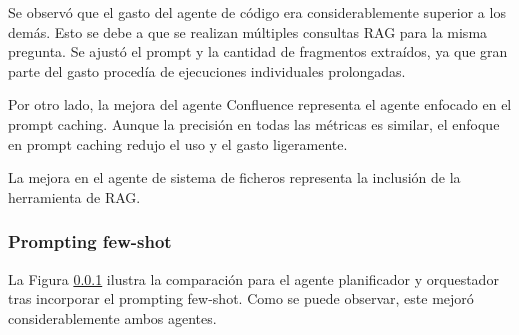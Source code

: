 Se observó que el gasto del agente de código era considerablemente superior a los demás. Esto se debe a que se realizan múltiples consultas RAG para la misma pregunta. Se ajustó el prompt y la cantidad de fragmentos extraídos, ya que gran parte del gasto procedía de ejecuciones individuales prolongadas.

Por otro lado, la mejora del agente Confluence representa el agente enfocado en el prompt caching. Aunque la precisión en todas las métricas es similar, el enfoque en prompt caching redujo el uso y el gasto ligeramente.

La mejora en el agente de sistema de ficheros representa la inclusión de la herramienta de RAG.

\subsubsection{Prompting few-shot}
La Figura \ref{} ilustra la comparación para el agente planificador y orquestador tras incorporar el prompting few-shot. Como se puede observar, este mejoró considerablemente ambos agentes.


